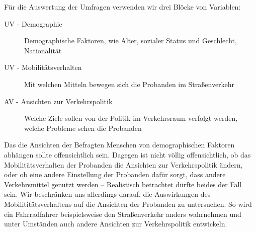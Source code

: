 Für die Auswertung der Umfragen verwenden wir drei Blöcke von Variablen:
\begin{description}
	\item[UV - Demographie] Demographische Faktoren, wie Alter, sozialer Status und Geschlecht, Nationalität
	\item[UV - Mobilitätsverhalten] Mit welchen Mitteln bewegen sich die Probanden im Straßenverkehr
	\item[AV - Ansichten zur Verkehrspolitik] Welche Ziele sollen von der Politik im Verkehrsraum verfolgt werden, welche Probleme sehen die Probanden
\end{description}
Das die Ansichten der Befragten Menschen von demographischen Faktoren abhängen sollte offensichtlich sein.
Dagegen ist nicht völlig offensichtlich, ob das Mobilitätsverhalten der Probanden die Ansichten zur Verkehrspolitik ändern, oder ob eine andere Einstellung der Probanden dafür sorgt, dass andere Verkehrsmittel genutzt werden – Realistisch betrachtet dürfte beides der Fall sein.
Wir beschränken uns allerdings darauf, die Auswirkungen des Mobilititätsverhaltens auf die Ansichten der Probanden zu untersuchen.
So wird ein Fahrradfahrer beispielsweise den Straßenverkehr anders wahrnehmen und unter Umständen auch andere Ansichten zur Verkehrspolitik entwickeln.
\nocite{schulz}
